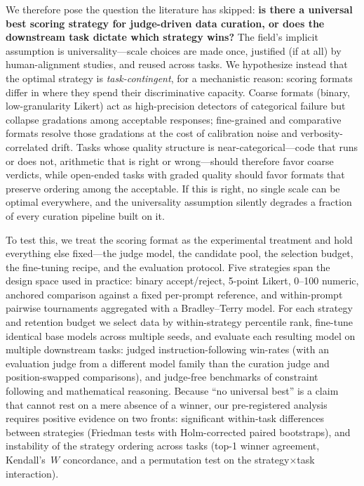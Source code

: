 We therefore pose the question the literature has skipped: \textbf{is
there a universal best scoring strategy for judge-driven data curation, or
does the downstream task dictate which strategy wins?} The field's
implicit assumption is universality---scale choices are made once,
justified (if at all) by human-alignment studies, and reused across tasks.
We hypothesize instead that the optimal strategy is
\emph{task-contingent}, for a mechanistic reason: scoring formats differ
in where they spend their discriminative capacity. Coarse formats (binary,
low-granularity Likert) act as high-precision detectors of categorical
failure but collapse gradations among acceptable responses; fine-grained
and comparative formats resolve those gradations at the cost of
calibration noise and verbosity-correlated drift. Tasks whose quality
structure is near-categorical---code that runs or does not, arithmetic
that is right or wrong---should therefore favor coarse verdicts, while
open-ended tasks with graded quality should favor formats that preserve
ordering among the acceptable. If this is right, no single scale can be
optimal everywhere, and the universality assumption silently degrades a
fraction of every curation pipeline built on it.

To test this, we treat the scoring format as the experimental treatment
and hold everything else fixed---the judge model, the candidate pool, the
selection budget, the fine-tuning recipe, and the evaluation protocol.
Five strategies span the design space used in practice: binary
accept/reject, 5-point Likert, 0--100 numeric, anchored comparison against
a fixed per-prompt reference, and within-prompt pairwise tournaments
aggregated with a Bradley--Terry model. For each strategy and retention
budget we select data by within-strategy percentile rank, fine-tune
identical base models across multiple seeds, and evaluate each resulting
model on multiple downstream tasks: judged instruction-following win-rates
(with an evaluation judge from a different model family than the curation
judge and position-swapped comparisons), and judge-free benchmarks of
constraint following and mathematical reasoning. Because ``no universal
best'' is a claim that cannot rest on a mere absence of a winner, our
pre-registered analysis requires positive evidence on two fronts:
significant within-task differences between strategies (Friedman tests
with Holm-corrected paired bootstraps), and instability of the strategy
ordering across tasks (top-1 winner agreement, Kendall's~$W$ concordance,
and a permutation test on the strategy$\times$task interaction).

